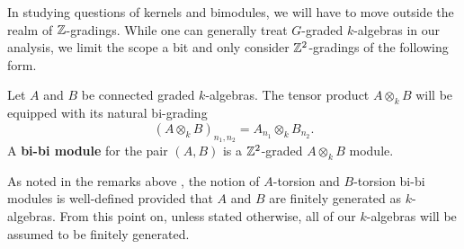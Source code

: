 In studying questions of kernels and bimodules, we will have to move outside the realm of \(\mathbb{Z}\)-gradings. While one can generally treat \(G\)-graded \(k\)-algebras in our analysis, we limit the scope a bit and only consider \(\mathbb{Z}^2\)-gradings of the following form.

\begin{definition}
  Let \(A\) and \(B\) be connected graded \(k\)-algebras. The tensor product \(A \otimes_k B\) will be equipped with its natural bi-grading 
  \begin{displaymath}
    (A \otimes_k B)_{n_1,n_2} = A_{n_1} \otimes_k B_{n_2}. 
  \end{displaymath}
  A \textbf{bi-bi module} for the pair \((A,B)\) is a \(\mathbb{Z}^2\)-graded \(A \otimes_k B\) module. 
\end{definition}

\begin{remark}
  As noted in the remarks above \parencite[Lemma 4.1]{VdB}, the notion of \(A\)-torsion and \(B\)-torsion bi-bi modules is well-defined provided that \(A\) and \(B\) are finitely generated as \(k\)-algebras.
  From this point on, unless stated otherwise, all of our \(k\)-algebras will be assumed to be finitely generated.
\end{remark}



